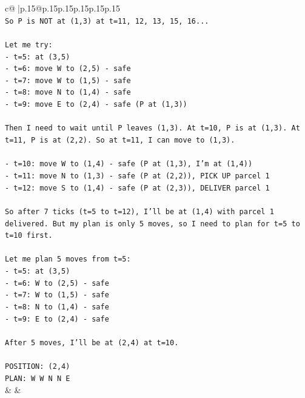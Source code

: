 \documentclass{article}
\begin{document}
{\begin{supertabular}{c@{$\;$}|p{.15\linewidth}@{}p{.15\linewidth}p{.15\linewidth}p{.15\linewidth}p{.15\linewidth}p{.15\linewidth}}
{{{\\ 
\texttt{So P is NOT at (1,3) at t=11, 12, 13, 15, 16...} \\
\\ 
\texttt{Let me try:} \\
\texttt{{-} t=5: at (3,5)} \\
\texttt{{-} t=6: move W to (2,5) {-} safe} \\
\texttt{{-} t=7: move W to (1,5) {-} safe} \\
\texttt{{-} t=8: move N to (1,4) {-} safe} \\
\texttt{{-} t=9: move E to (2,4) {-} safe (P at (1,3))} \\
\\ 
\texttt{Then I need to wait until P leaves (1,3). At t=10, P is at (1,3). At t=11, P is at (2,2). So at t=11, I can move to (1,3).} \\
\\ 
\texttt{{-} t=10: move W to (1,4) {-} safe (P at (1,3), I'm at (1,4))} \\
\texttt{{-} t=11: move N to (1,3) {-} safe (P at (2,2)), PICK UP parcel 1} \\
\texttt{{-} t=12: move S to (1,4) {-} safe (P at (2,3)), DELIVER parcel 1} \\
\\ 
\texttt{So after 7 ticks (t=5 to t=12), I'll be at (1,4) with parcel 1 delivered. But my plan is only 5 moves, so I need to plan for t=5 to t=10 first.} \\
\\ 
\texttt{Let me plan 5 moves from t=5:} \\
\texttt{{-} t=5: at (3,5)} \\
\texttt{{-} t=6: W to (2,5) {-} safe} \\
\texttt{{-} t=7: W to (1,5) {-} safe} \\
\texttt{{-} t=8: N to (1,4) {-} safe} \\
\texttt{{-} t=9: E to (2,4) {-} safe} \\
\\ 
\texttt{After 5 moves, I'll be at (2,4) at t=10.} \\
\\ 
\texttt{POSITION: (2,4)} \\
\texttt{PLAN: W W N N E} \\
            }
        }
    }
    & & \\ \\


\end{supertabular}}
\end{document}
